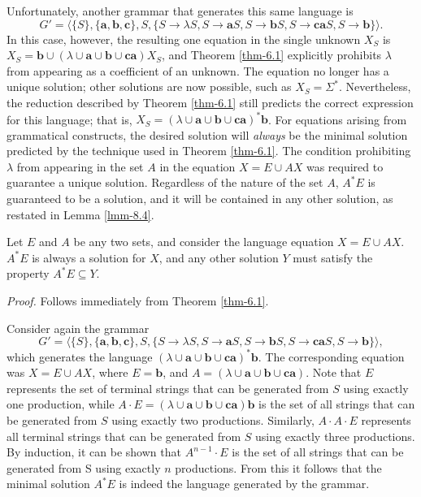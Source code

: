 Unfortunately, another grammar that generates this same language is
\[ G'=\langle\{S\},\{\pmb{a},\pmb{b},\pmb{c}\},S,\{S\rightarrow\lambda S,S
	\rightarrow\pmb{a}S,S\rightarrow\pmb{b}S,S\rightarrow\pmb{ca}S,S
	\rightarrow\pmb{b}\}\rangle. \]
In this case, however, the resulting one equation in the single unknown $X_S$ is
$X_S=\pmb{b}\cup(\lambda\cup\pmb{a}\cup\pmb{b}\cup\pmb{ca})X_S$, and Theorem \ref{thm-6.1}
explicitly prohibits $\lambda$ from appearing as a coefficient of an unknown.
The equation no longer has a unique solution; other solutions are now possible,
such as $X_S=\Sigma^*$. Nevertheless, the reduction described by Theorem \ref{thm-6.1}
still predicts the correct expression for this language; that is, $X_S=(\lambda
\cup\pmb{a}\cup\pmb{b}\cup\pmb{ca})^*\pmb{b}$. For equations arising from
grammatical constructs, the desired solution will \emph{always} be the minimal
solution predicted by the technique used in Theorem \ref{thm-6.1}. The condition
prohibiting $\lambda$ from appearing in the set $A$ in the equation $X=E\cup AX$
was required to guarantee a unique solution. Regardless of the nature of the set
$A$, $A^*E$ is guaranteed to be a solution, and it will be contained in any
other solution, as restated in Lemma \ref{lmm-8.4}.

\begin{lmm}\label{lmm-8.4}
Let $E$ and $A$ be any two sets, and consider the language equation $X=E\cup AX$.
$A^*E$ is always a solution for $X$, and any other solution $Y$ must satisfy the
property $A^*E \subseteq Y$.

\emph{Proof.} Follows immediately from Theorem \ref{thm-6.1}.
\end{lmm}

Consider again the grammar
\[ G' = \langle\{S\},\{\pmb{a},\pmb{b},\pmb{c}\},S,\{S\rightarrow\lambda S,S
	\rightarrow\pmb{a}S,S\rightarrow\pmb{b}S,S\rightarrow\pmb{ca}S,S
	\rightarrow\pmb{b}\}\rangle, \]
which generates the language $(\lambda\cup\pmb{a}\cup\pmb{b}\cup\pmb{ca})^*
\pmb{b}$. The corresponding equation was $X=E\cup AX$, where $E=\pmb{b}$, and
$A=(\lambda\cup\pmb{a}\cup\pmb{b}\cup\pmb{ca})$. Note that $E$ represents the
set of terminal strings that can be generated from $S$ using exactly one
production, while $A\cdot E=(\lambda\cup\pmb{a}\cup\pmb{b}\cup\pmb{ca})\pmb{b}$
is the set of all strings that can be generated from $S$ using exactly two
productions. Similarly, $A\cdot A\cdot E$ represents all terminal strings
that can be generated from $S$ using exactly three productions. By induction, it
can be shown that $A^{n-1}\cdot E$ is the set of all strings that can be
generated from S using exactly $n$ productions. From this it follows that the
minimal solution $A^*E$ is indeed the language generated by the grammar.

